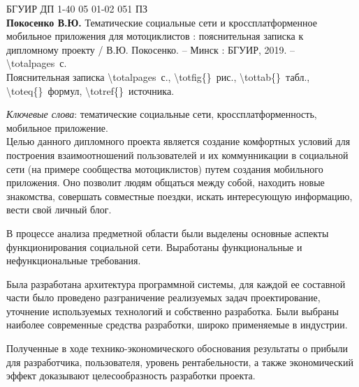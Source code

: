 \thispagestyle{empty}


\noindent
{БГУИР ДП 1-40 05 01-02 051 ПЗ}\\

\textbf{Покосенко В.Ю.} Тематические социальные сети и кроссплатформенное мобильное приложения для мотоциклистов : пояснительная записка к дипломному проекту / В.Ю. Покосенко. – Минск : БГУИР, 2019. – \num{\totalpages}~с. \\

Пояснительная записка \num{\totalpages}~с., \num{\totfig{}}~рис., \num{\tottab{}}~табл., \num{\toteq{}}~формул, \num{\totref{}}~источника.

\emph{Ключевые слова}: тематические социальные сети, кроссплатформенность, мобильное приложение. \\

Целью данного дипломного проекта является создание комфортных условий для построения взаимоотношений пользователей и их коммунникации в социальной сети (на примере сообщества мотоциклистов) путем создания мобильного приложения. 
Оно позволит людям общаться между собой, находить новые
знакомства, совершать совместные поездки, искать интересующую информацию, вести свой личный блог.

В процессе анализа предметной области были выделены основные аспекты функционирования социальной сети. Выработаны функциональные и нефункциональные требования.

Была разработана архитектура программной системы, для каждой ее составной части было проведено разграничение реализуемых задач проектирование, уточнение используемых технологий и собственно разработка. Были выбраны наиболее современные средства разработки, широко применяемые в индустрии. 

Полученные в ходе технико-экономического обоснования результаты о прибыли для разработчика, пользователя, уровень рентабельности, а также экономический эффект доказывают целесообразность разработки про\-екта.

